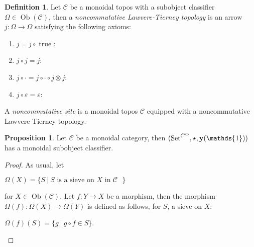 \documentclass[8pt]{article}
\theoremstyle{definition}
\newtheorem{definition}{Definition}[section]
\theoremstyle{definition}
\theoremstyle{definition}
\theoremstyle{definition}
\theoremstyle{definition}
\theoremstyle{definition}
\theoremstyle{definition}
\newtheorem{prop}{Proposition}[section]
\theoremstyle{definition}
\theoremstyle{definition}
\theoremstyle{definition}
\theoremstyle{definition}
\theoremstyle{definition}
\theoremstyle{definition}
\theoremstyle{question}
\newcommand{\Ob}[1]{\operatorname{Ob}({\mathcal{#1}})}
\begin{document}
\begin{definition}
  Let $\mathcal{C}$ be a monoidal topos with a subobject classifier 
  $\Omega \in \Ob{C}$, then a \emph{noncommutative Lawvere-Tierney topology} is an arrow $j : \Omega \to \Omega$ 
  satisfying the following axioms:
  \begin{enumerate}
    \item $j = j \circ \operatorname{true}$:

    \centerline{
    }
    \item $j \circ j = j$:

    \centerline{
    }
    \item $j \circ \cdot = j \circ \cdot \circ j \otimes j$:

    \centerline{
    }
    \item $j \circ \varepsilon = \varepsilon$:

    \centerline{
    }
  \end{enumerate}
\end{definition}

A \emph{noncommutative site} is a monoidal topos $\mathcal{C}$ equipped with
a noncommutative Lawvere-Tierney topology.

\begin{prop}
  Let $\mathcal{C}$ be a monoidal category,
  then $(\operatorname{Set}^{\mathcal{C}^{\operatorname{op}}}, \star, {\bf y}(\mathds{1}))$
  has a monoidal subobject classifier.
\end{prop}

\begin{proof}
  As usual, let
  \begin{center}
    $\Omega(X) = \{ S \: | \: \text{$S$ is a sieve on $X$ in $\mathcal{C}$ }\}$
  \end{center}
  for $X \in \Ob{C}$. Let $f : Y \to X$ be a morphism, then the morphism 
  $\Omega(f) : \Omega(X) \to \Omega(Y)$ is defined as follows, for $S$, a sieve on $X$:
  \begin{center}
    $\Omega(f)(S) = \{ g \: | \: g \circ f \in S \}$.
  \end{center}
\end{proof}
\end{document}
